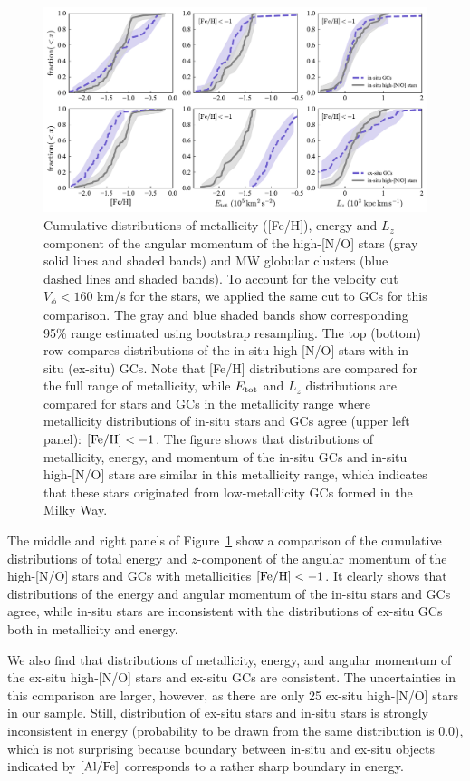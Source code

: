 \documentclass[a4paper,useAMS,usenatbib]{mnras}
\begin{document}
%
\begin{figure}
  \centering
  \includegraphics[width=\textwidth]{img/gcns_feh_elz_dist.pdf}
  \caption[]{Cumulative distributions of metallicity ([Fe/H]), energy and $L_z$ component of the angular momentum of the  high-[N/O] stars (gray solid lines and shaded bands) and MW globular clusters (blue dashed lines and shaded bands). To account 
  for the velocity cut $V_\phi<160$ km/s for the stars, we applied the same cut to GCs for this comparison. The gray and blue shaded bands show corresponding 95\% range estimated using bootstrap resampling. The top (bottom) row compares distributions of the 
  in-situ  high-[N/O] stars with in-situ (ex-situ) GCs. Note that [Fe/H] distributions are compared for the full range of metallicity, while $E_{\rm tot}$ and $L_z$ distributions are compared for stars and GCs in the metallicity range where metallicity distributions of in-situ stars and GCs agree (upper left panel): $\rm [Fe/H]<-1$. 
 The figure shows that distributions of metallicity, energy, and momentum of the in-situ GCs and in-situ high-[N/O] stars are similar in this metallicity range, which indicates that these stars originated from low-metallicity GCs formed in the Milky Way. }
   \label{fig:feh_dist_ns_gc}
\end{figure}
%

The middle and right panels of Figure~\ref{fig:feh_dist_ns_gc} show a comparison of the cumulative distributions of total energy and $z$-component of the angular momentum of the high-[N/O] stars and GCs with metallicities $\rm [Fe/H]<-1$. It clearly shows
that distributions of the energy and angular momentum of the in-situ stars and GCs agree, while in-situ stars are inconsistent with the distributions of ex-situ GCs both in metallicity and energy. 

We also find that distributions of metallicity, energy, and angular momentum of the ex-situ high-[N/O] stars and ex-situ GCs are consistent. The uncertainties in this comparison are larger, however, as there are only 25 ex-situ high-[N/O] stars in our sample. Still,  
distribution of ex-situ stars and in-situ stars is strongly inconsistent in energy (probability to be drawn from the same distribution is 0.0), which is not surprising because boundary between in-situ and ex-situ objects indicated by $\rm [Al/Fe]$ corresponds to a rather sharp boundary in energy. 
\end{document}
